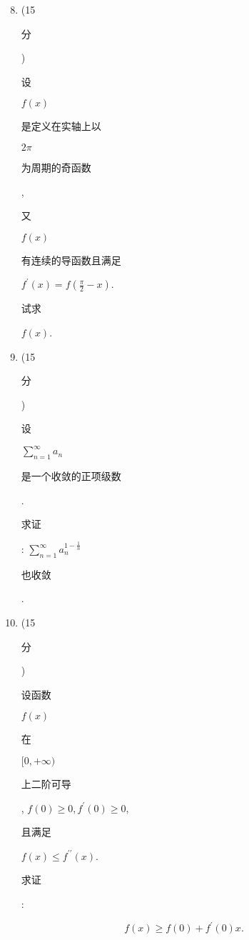 \documentclass[10pt]{article}
\begin{document}
\begin{enumerate}
  \setcounter{enumi}{7}
  \item (15 \begin{CJK}{UTF8}{mj}分\end{CJK}) \begin{CJK}{UTF8}{mj}设\end{CJK} $f(x)$ \begin{CJK}{UTF8}{mj}是定义在实轴上以\end{CJK} $2 \pi$ \begin{CJK}{UTF8}{mj}为周期的奇函数\end{CJK}, \begin{CJK}{UTF8}{mj}又\end{CJK} $f(x)$ \begin{CJK}{UTF8}{mj}有连续的导函数且满足\end{CJK} $f^{\prime}(x)=f\left(\frac{\pi}{2}-x\right)$. \begin{CJK}{UTF8}{mj}试求\end{CJK} $f(x)$.

  \item (15 \begin{CJK}{UTF8}{mj}分\end{CJK}) \begin{CJK}{UTF8}{mj}设\end{CJK} $\sum_{n=1}^{\infty} a_{n}$ \begin{CJK}{UTF8}{mj}是一个收敛的正项级数\end{CJK}. \begin{CJK}{UTF8}{mj}求证\end{CJK}: $\sum_{n=1}^{\infty} a_{n}^{1-\frac{1}{n}}$ \begin{CJK}{UTF8}{mj}也收敛\end{CJK}.

  \item (15 \begin{CJK}{UTF8}{mj}分\end{CJK}) \begin{CJK}{UTF8}{mj}设函数\end{CJK} $f(x)$ \begin{CJK}{UTF8}{mj}在\end{CJK} $[0,+\infty)$ \begin{CJK}{UTF8}{mj}上二阶可导\end{CJK}, $f(0) \geqslant 0, f^{\prime}(0) \geqslant 0$, \begin{CJK}{UTF8}{mj}且满足\end{CJK} $f(x) \leqslant f^{\prime \prime}(x)$. \begin{CJK}{UTF8}{mj}求证\end{CJK}:

\end{enumerate}
$$
f(x) \geqslant f(0)+f^{\prime}(0) x .
$$
\end{document}
